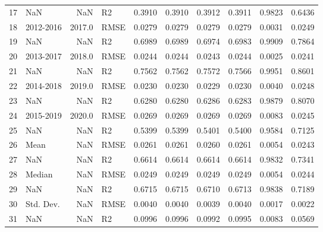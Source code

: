 \begin{tabular}{llrlrrrrrr}
17 &        NaN &     NaN &      R2 &  0.3910 &  0.3910 &  0.3912 &       0.3911 &  0.9823 &  0.6436 \\
18 &  2012-2016 &  2017.0 &    RMSE &  0.0279 &  0.0279 &  0.0279 &       0.0279 &  0.0031 &  0.0249 \\
19 &        NaN &     NaN &      R2 &  0.6989 &  0.6989 &  0.6974 &       0.6983 &  0.9909 &  0.7864 \\
20 &  2013-2017 &  2018.0 &    RMSE &  0.0244 &  0.0244 &  0.0243 &       0.0244 &  0.0025 &  0.0241 \\
21 &        NaN &     NaN &      R2 &  0.7562 &  0.7562 &  0.7572 &       0.7566 &  0.9951 &  0.8601 \\
22 &  2014-2018 &  2019.0 &    RMSE &  0.0230 &  0.0230 &  0.0229 &       0.0230 &  0.0040 &  0.0248 \\
23 &        NaN &     NaN &      R2 &  0.6280 &  0.6280 &  0.6286 &       0.6283 &  0.9879 &  0.8070 \\
24 &  2015-2019 &  2020.0 &    RMSE &  0.0269 &  0.0269 &  0.0269 &       0.0269 &  0.0083 &  0.0245 \\
25 &        NaN &     NaN &      R2 &  0.5399 &  0.5399 &  0.5401 &       0.5400 &  0.9584 &  0.7125 \\
26 &       Mean &     NaN &    RMSE &  0.0261 &  0.0261 &  0.0260 &       0.0261 &  0.0054 &  0.0243 \\
27 &        NaN &     NaN &      R2 &  0.6614 &  0.6614 &  0.6614 &       0.6614 &  0.9832 &  0.7341 \\
28 &     Median &     NaN &    RMSE &  0.0249 &  0.0249 &  0.0249 &       0.0249 &  0.0054 &  0.0244 \\
29 &        NaN &     NaN &      R2 &  0.6715 &  0.6715 &  0.6710 &       0.6713 &  0.9838 &  0.7189 \\
30 &  Std. Dev. &     NaN &    RMSE &  0.0040 &  0.0040 &  0.0039 &       0.0040 &  0.0017 &  0.0022 \\
31 &        NaN &     NaN &      R2 &  0.0996 &  0.0996 &  0.0992 &       0.0995 &  0.0083 &  0.0569 \\
\bottomrule
\end{tabular}
